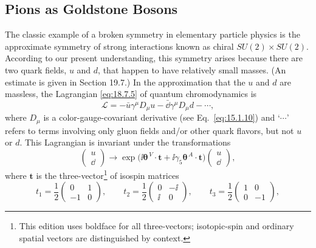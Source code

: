 
\subsection{Pions as Goldstone Bosons}
\label{sec:19.4}

The classic example of a broken symmetry in elementary particle physics is the approximate symmetry of strong interactions known as chiral $SU(2)\times SU(2)$. According to our present understanding, this symmetry arises because there are two quark fields, $u$ and $d$, that happen to have relatively small masses. (An estimate is given in Section 19.7.) In the approximation that the $u$ and $d$ are massless, the Lagrangian \eqref{eq:18.7.5} of quantum chromodynamics is
\begin{equation}
\mathcal L=-\bar u\gamma^\mu D_\mu u-\bar \dd\gamma^\mu D_\mu d-\cdots,
\tag{19.4.1}\label{eq:19.4.1}
\end{equation}
where $D_\mu$ is a color-gauge-covariant derivative (see Eq.~\eqref{eq:15.1.10}) and `$\cdots$' refers to terms involving only gluon fields and/or other quark flavors, but not $u$ or $d$. This Lagrangian is invariant under the transformations
\begin{equation}
\begin{pmatrix}u\\\dd\end{pmatrix}
\longrightarrow
\exp\bigl(\ii\boldsymbol{\theta}^{\,V}\cdot\mathbf{t}
+\ii\gamma_5\boldsymbol{\theta}^{\,A}\cdot\mathbf{t}\bigr)
\begin{pmatrix}u\\\dd\end{pmatrix},
\tag{19.4.2}\label{eq:19.4.2}
\end{equation}
where $\mathbf{t}$ is the three-vector\footnote{This edition uses boldface for
all three-vectors; isotopic-spin and ordinary spatial vectors are
distinguished by context.} of isospin matrices
\[
t_1=\frac12
\begin{pmatrix}0&1\\-1&0\end{pmatrix},
\qquad
t_2=\frac12
\begin{pmatrix}0&-\ii\\\ii&0\end{pmatrix},
\qquad
t_3=\frac12
\begin{pmatrix}1&0\\0&-1\end{pmatrix},
\]
